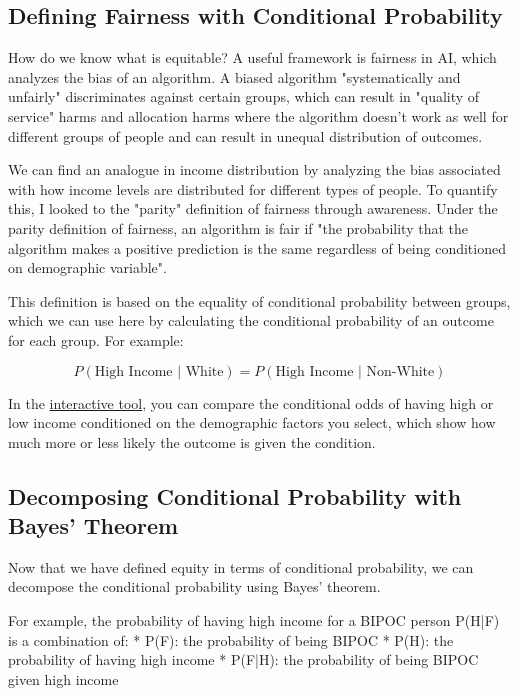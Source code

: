 \documentclass[11pt]{article}
\begin{document}
\subsection*{Defining Fairness with Conditional Probability}

How do we know what is equitable? A useful framework is fairness in AI, which analyzes the bias of an algorithm. A biased algorithm "systematically and unfairly" discriminates against certain groups, which can result in "quality of service" harms and allocation harms where the algorithm doesn't work as well for different groups of people and can result in unequal distribution of outcomes.\cite{creel}

We can find an analogue in income distribution by analyzing the bias associated with how income levels are distributed for different types of people. To quantify this, I looked to the "parity" definition of fairness through awareness. Under the parity definition of fairness, an algorithm is fair if "the probability that the algorithm makes a positive prediction is the same regardless of being conditioned on demographic variable".\cite{piech:fair}

This definition is based on the equality of conditional probability between groups, which we can use here by calculating the conditional probability of an outcome for each group. For example:

$$P(\text{High Income | White}) = P(\text{High Income | Non-White})$$

In the \href{https://observablehq.com/@chaya/check-for-your-privilege}{interactive tool}, you can compare the conditional odds of having high or low income conditioned on the demographic factors you select, which show  how much more or less likely the outcome is given the condition.\cite[p.~70]{ross}

\subsection*{Decomposing Conditional Probability with Bayes' Theorem}

Now that we have defined equity in terms of conditional probability, we can decompose the conditional probability using Bayes' theorem.\cite{piech:bayes} 

For example, the probability of having high income for a BIPOC person P(H|F) is a combination of: 
* P(F): the probability of being BIPOC
* P(H): the probability of having high income
* P(F|H): the probability of being BIPOC given high income
\end{document}
